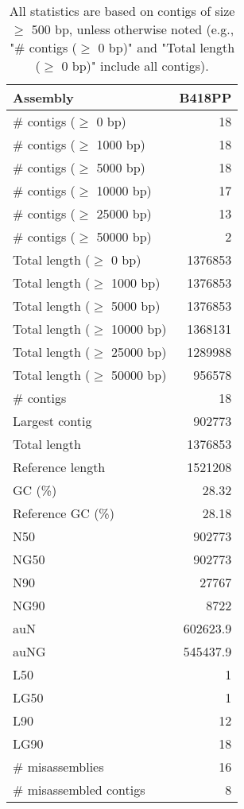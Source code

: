 \documentclass[12pt,a4paper]{article}
\begin{document}
\begin{table}[ht]
\begin{center}
\caption{All statistics are based on contigs of size $\geq$ 500 bp, unless otherwise noted (e.g., "\# contigs ($\geq$ 0 bp)" and "Total length ($\geq$ 0 bp)" include all contigs).}
\begin{tabular}{|l*{1}{|r}|}
\hline
Assembly & B418PP \\ \hline
\# contigs ($\geq$ 0 bp) & 18 \\ \hline
\# contigs ($\geq$ 1000 bp) & 18 \\ \hline
\# contigs ($\geq$ 5000 bp) & 18 \\ \hline
\# contigs ($\geq$ 10000 bp) & 17 \\ \hline
\# contigs ($\geq$ 25000 bp) & 13 \\ \hline
\# contigs ($\geq$ 50000 bp) & 2 \\ \hline
Total length ($\geq$ 0 bp) & 1376853 \\ \hline
Total length ($\geq$ 1000 bp) & 1376853 \\ \hline
Total length ($\geq$ 5000 bp) & 1376853 \\ \hline
Total length ($\geq$ 10000 bp) & 1368131 \\ \hline
Total length ($\geq$ 25000 bp) & 1289988 \\ \hline
Total length ($\geq$ 50000 bp) & 956578 \\ \hline
\# contigs & 18 \\ \hline
Largest contig & 902773 \\ \hline
Total length & 1376853 \\ \hline
Reference length & 1521208 \\ \hline
GC (\%) & 28.32 \\ \hline
Reference GC (\%) & 28.18 \\ \hline
N50 & 902773 \\ \hline
NG50 & 902773 \\ \hline
N90 & 27767 \\ \hline
NG90 & 8722 \\ \hline
auN & 602623.9 \\ \hline
auNG & 545437.9 \\ \hline
L50 & 1 \\ \hline
LG50 & 1 \\ \hline
L90 & 12 \\ \hline
LG90 & 18 \\ \hline
\# misassemblies & 16 \\ \hline
\# misassembled contigs & 8 \\ \hline

\end{tabular}
\end{center}
\end{table}
\end{document}
